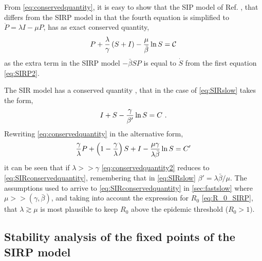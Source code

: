 From \cref{eq:conservedquantity}, it is easy to show that the SIP model
of Ref. \cite{article_SIP}, that differs from the SIRP model in that the
fourth equation is simplified to $\dot{P}=\lambda I-\mu P$, has as
exact conserved quantity,
\begin{equation}
    P + \frac{\lambda}{\gamma}\left(S+I\right)-\frac{\mu}{\bar{\beta}}\ln
    S={\mathcal C}
    \label{eq:conservedquantitySIP}
\end{equation}
as the extra term in the SIRP model $-\bar{\beta}SP$ is equal to $\dot{S}$
from the first equation \cref{eq:SIRP2}.

The SIR model has a conserved quantity \cite{Murray_book}, that in the case
of
\cref{eq:SIRslow} takes the form,
\begin{equation}
    I+S-{{\gamma}\over{\beta'}} \ln S =C\ .
    \label{eq:SIRconservedquantity}
\end{equation}
Rewriting \cref{eq:conservedquantity} in the alternative form,
\begin{equation}
    {{\gamma}\over{\lambda}} P +\left(1-{{\gamma}\over{\lambda}}\right) S + I
    -{{\mu\gamma}\over{\lambda\bar{\beta}}} \ln S=C'
    \label{eq:conservedquantity2}
\end{equation}
it can be seen that if $\lambda>>\gamma$ \cref{eq:conservedquantity2} reduces
to
\cref{eq:SIRconservedquantity}, remembering that in \cref{eq:SIRslow}
$\beta'=\lambda\bar{\beta}/\mu$. The assumptions used to arrive to
\cref{eq:SIRconservedquantity} in \cref{sec:fastslow} where
$\mu>>(\gamma,\bar{\beta})$, and taking into account the expression for $R_0$
\cref{eq:R_0_SIRP}, that $\lambda\gtrsim\mu$ is most plausible to keep $R_0$
above the epidemic threshold ($R_0>1)$.

\subsection{Stability analysis of the fixed points of the SIRP model}
\label{app:linstabfp}

